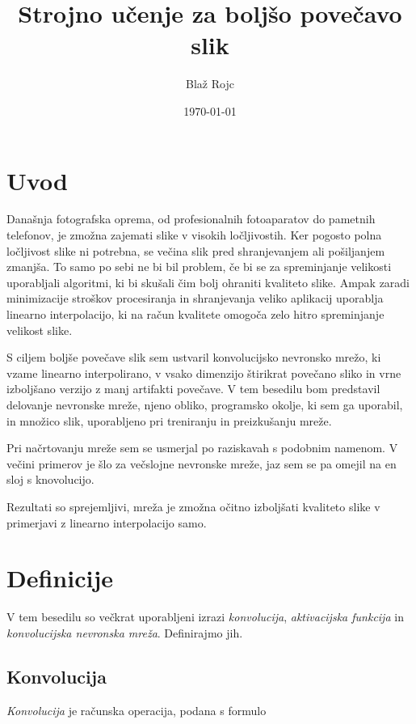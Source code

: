\documentclass[a4paper,11pt,titlepage]{article}
\title{Strojno učenje za boljšo povečavo slik}
\author{Blaž Rojc}
\date{\today}
\begin{document}
\maketitle

\section{Uvod}

Današnja fotografska oprema, od profesionalnih fotoaparatov do pametnih telefonov, je zmožna zajemati slike v visokih ločljivostih.
Ker pogosto polna ločljivost slike ni potrebna, se večina slik pred shranjevanjem ali pošiljanjem zmanjša.
To samo po sebi ne bi bil problem, če bi se za spreminjanje velikosti uporabljali algoritmi, ki bi skušali čim bolj ohraniti kvaliteto slike.
Ampak zaradi minimizacije stroškov procesiranja in shranjevanja veliko aplikacij uporablja linearno interpolacijo, ki na račun kvalitete omogoča zelo
	hitro spreminjanje velikost slike.

S ciljem boljše povečave slik sem ustvaril konvolucijsko nevronsko mrežo, ki vzame linearno interpolirano, v vsako dimenzijo štirikrat povečano sliko
	in vrne izboljšano verzijo z manj artifakti povečave.
V tem besedilu bom predstavil delovanje nevronske mreže, njeno obliko, programsko okolje, ki sem ga uporabil, in množico slik, uporabljeno
	pri treniranju in preizkušanju mreže.

Pri načrtovanju mreže sem se usmerjal po raziskavah s podobnim namenom. \cite{intel1, intel2, intel3}
V večini primerov je šlo za večslojne nevronske mreže, jaz sem se pa omejil na en sloj s knovolucijo.

Rezultati so sprejemljivi, mreža je zmožna očitno izboljšati kvaliteto slike v primerjavi z linearno interpolacijo samo.

\section{Definicije}

V tem besedilu so večkrat uporabljeni izrazi \emph{konvolucija}, \emph{aktivacijska funkcija} in \emph{konvolucijska nevronska mreža}.
Definirajmo jih.

\subsection{Konvolucija}

\emph{Konvolucija} \cite{torch_conv2d} je računska operacija, podana s formulo
\end{document}
